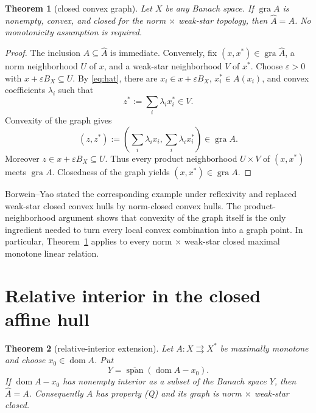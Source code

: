 \documentclass[11pt]{article}
\newtheorem{theorem}{Theorem}
\newcommand{\gra}{\operatorname{gra}}
\newcommand{\domn}{\operatorname{dom}}
\begin{document}
\begin{theorem}[closed convex graph]\label{thm:convex}
Let $X$ be any Banach space.  If $\gra A$ is nonempty, convex, and closed for
the norm $\times$ weak-star topology, then $\widehat A=A$.
No monotonicity assumption is required.
\end{theorem}

\begin{proof}
The inclusion $A\subseteq\widehat A$ is immediate.  Conversely, fix
$(x,x^*)\in\gra\widehat A$, a norm neighborhood $U$ of $x$, and a weak-star
neighborhood $V$ of $x^*$.  Choose $\varepsilon>0$ with
$x+\varepsilon B_X\subseteq U$.  By \eqref{eq:hat}, there are
$x_i\in x+\varepsilon B_X$, $x_i^*\in A(x_i)$, and convex coefficients
$\lambda_i$ such that
\[
 z^*:=\sum_i\lambda_i x_i^*\in V.
\]
Convexity of the graph gives
\[
 \left(z,z^*\right):=\left(\sum_i\lambda_i x_i,
 \sum_i\lambda_i x_i^*\right)\in\gra A.
\]
Moreover $z\in x+\varepsilon B_X\subseteq U$.  Thus every product
neighborhood $U\times V$ of $(x,x^*)$ meets $\gra A$.  Closedness of the
graph yields $(x,x^*)\in\gra A$.
\end{proof}

Borwein--Yao stated the corresponding example under reflexivity and replaced
weak-star closed convex hulls by norm-closed convex hulls.  The product-
neighborhood argument shows that convexity of the graph itself is the only
ingredient needed to turn every local convex combination into a graph point.
In particular, Theorem~\ref{thm:convex} applies to every norm $\times$
weak-star closed maximal monotone linear relation.

\section{Relative interior in the closed affine hull}

\begin{theorem}[relative-interior extension]\label{thm:relative}
Let $A:X\rightrightarrows X^*$ be maximally monotone and choose
$x_0\in\domn A$.  Put
\[
 Y=\overline{\operatorname{span}}(\domn A-x_0).
\]
If $\domn A-x_0$ has nonempty interior as a subset of the Banach space $Y$,
then $\widehat A=A$.  Consequently $A$ has property (Q) and its graph is norm
$\times$ weak-star closed.
\end{theorem}
\end{document}
